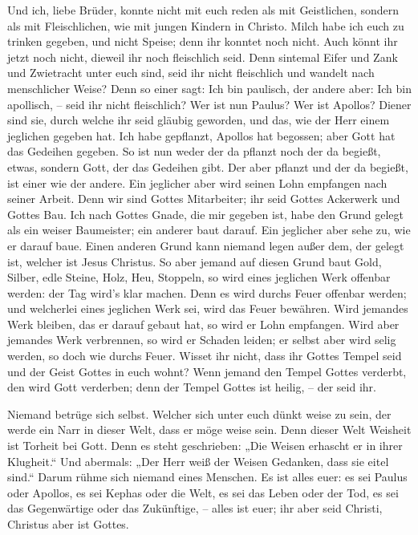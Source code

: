  Und ich, liebe Brüder, konnte nicht mit euch reden als
mit Geistlichen, sondern als mit Fleischlichen, wie mit jungen Kindern
in Christo.  Milch habe ich euch zu trinken gegeben, und
nicht Speise; denn ihr konntet noch nicht. Auch könnt ihr jetzt noch
nicht,  dieweil ihr noch fleischlich seid. Denn sintemal
Eifer und Zank und Zwietracht unter euch sind, seid ihr nicht
fleischlich und wandelt nach menschlicher Weise?  Denn so
einer sagt: Ich bin paulisch, der andere aber: Ich bin apollisch, --
seid ihr nicht fleischlich?  Wer ist nun Paulus? Wer ist
Apollos? Diener sind sie, durch welche ihr seid gläubig geworden, und
das, wie der Herr einem jeglichen gegeben hat.  Ich habe
gepflanzt, Apollos hat begossen; aber Gott hat das Gedeihen gegeben.
 So ist nun weder der da pflanzt noch der da begießt,
etwas, sondern Gott, der das Gedeihen gibt.  Der aber
pflanzt und der da begießt, ist einer wie der andere. Ein jeglicher aber
wird seinen Lohn empfangen nach seiner Arbeit.  Denn wir
sind Gottes Mitarbeiter; ihr seid Gottes Ackerwerk und Gottes Bau.
 Ich nach Gottes Gnade, die mir gegeben ist, habe den
Grund gelegt als ein weiser Baumeister; ein anderer baut darauf. Ein
jeglicher aber sehe zu, wie er darauf baue.  Einen
anderen Grund kann niemand legen außer dem, der gelegt ist, welcher ist
Jesus Christus.  So aber jemand auf diesen Grund baut
Gold, Silber, edle Steine, Holz, Heu, Stoppeln,  so wird
eines jeglichen Werk offenbar werden: der Tag wird's klar machen. Denn
es wird durchs Feuer offenbar werden; und welcherlei eines jeglichen
Werk sei, wird das Feuer bewähren.  Wird jemandes Werk
bleiben, das er darauf gebaut hat, so wird er Lohn empfangen.
 Wird aber jemandes Werk verbrennen, so wird er Schaden
leiden; er selbst aber wird selig werden, so doch wie durchs Feuer.
 Wisset ihr nicht, dass ihr Gottes Tempel seid und der
Geist Gottes in euch wohnt?  Wenn jemand den Tempel
Gottes verderbt, den wird Gott verderben; denn der Tempel Gottes ist
heilig, -- der seid ihr.

 Niemand betrüge sich selbst. Welcher sich unter euch
dünkt weise zu sein, der werde ein Narr in dieser Welt, dass er möge
weise sein.  Denn dieser Welt Weisheit ist Torheit bei
Gott. Denn es steht geschrieben: „Die Weisen erhascht er in ihrer
Klugheit.``  Und abermals: „Der Herr weiß der Weisen
Gedanken, dass sie eitel sind.``  Darum rühme sich
niemand eines Menschen. Es ist alles euer:  es sei Paulus
oder Apollos, es sei Kephas oder die Welt, es sei das Leben oder der
Tod, es sei das Gegenwärtige oder das Zukünftige, -- alles ist euer;
 ihr aber seid Christi, Christus aber ist Gottes.

